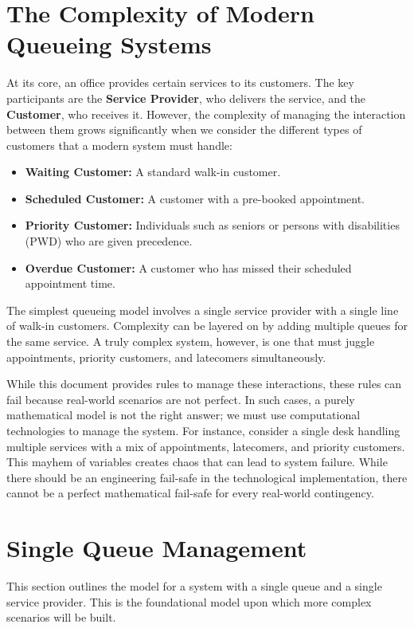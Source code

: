 \documentclass[12pt,a4paper]{report}
\begin{document}
\section{The Complexity of Modern Queueing Systems}
At its core, an office provides certain services to its customers. The key participants are the \textbf{Service Provider}, who delivers the service, and the \textbf{Customer}, who receives it. However, the complexity of managing the interaction between them grows significantly when we consider the different types of customers that a modern system must handle:
\begin{itemize}
    \item \textbf{Waiting Customer:} A standard walk-in customer.
    \item \textbf{Scheduled Customer:} A customer with a pre-booked appointment.
    \item \textbf{Priority Customer:} Individuals such as seniors or persons with disabilities (PWD) who are given precedence.
    \item \textbf{Overdue Customer:} A customer who has missed their scheduled appointment time.
\end{itemize}

The simplest queueing model involves a single service provider with a single line of walk-in customers. Complexity can be layered on by adding multiple queues for the same service. A truly complex system, however, is one that must juggle appointments, priority customers, and latecomers simultaneously.

While this document provides rules to manage these interactions, these rules can fail because real-world scenarios are not perfect. In such cases, a purely mathematical model is not the right answer; we must use computational technologies to manage the system. For instance, consider a single desk handling multiple services with a mix of appointments, latecomers, and priority customers. This mayhem of variables creates chaos that can lead to system failure. While there should be an engineering fail-safe in the technological implementation, there cannot be a perfect mathematical fail-safe for every real-world contingency.

\section{Single Queue Management}

This section outlines the model for a system with a single queue and a single service provider. This is the foundational model upon which more complex scenarios will be built.
\end{document}
